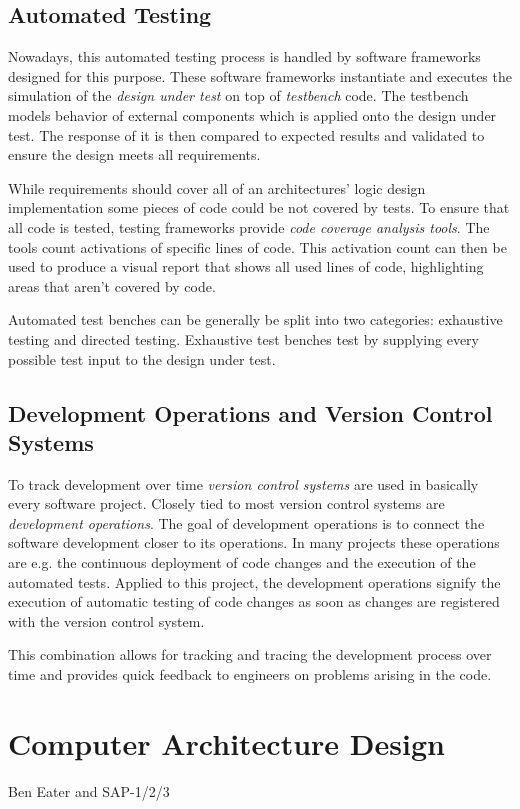 \subsection{Automated Testing}
Nowadays, this automated testing process is handled by software frameworks designed for this purpose. These software frameworks instantiate and executes the simulation of the \textit{design under test} on top of \textit{testbench} code. The testbench models behavior of external components which is applied onto the design under test. The response of it is then compared to expected results and validated to ensure the design meets all requirements.

While requirements should cover all of an architectures' logic design implementation some pieces of code could be not covered by tests. To ensure that all code is tested, testing frameworks provide \textit{code coverage analysis tools}. The tools count activations of specific lines of code. This activation count can then be used to produce a visual report that shows all used lines of code, highlighting areas that aren't covered by code.

Automated test benches can be generally be split into two categories: exhaustive testing and directed testing. Exhaustive test benches test by supplying every possible test input to the design under test. 

\cite{verilogtestbenches} \cite{exhaustivetesting} \cite{directedtesting}


\subsection{Development Operations and Version Control Systems}
To track development over time \textit{version control systems} are used in basically every software project. Closely tied to most version control systems are \textit{development operations}. The goal of development operations is to connect the software development closer to its operations. In many projects these operations are e.g. the continuous deployment of code changes and the execution of the automated tests. Applied to this project, the development operations signify the execution of automatic testing of code changes as soon as changes are registered with the version control system. 

This combination allows for tracking and tracing the development process over time and provides quick feedback to engineers on problems arising in the code.

\section{Computer Architecture Design}
Ben Eater and SAP-1/2/3
